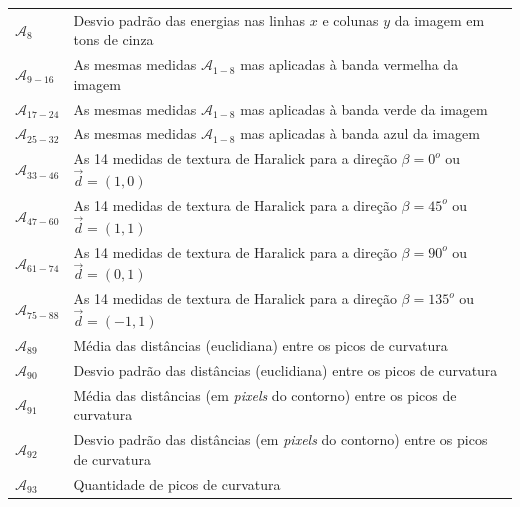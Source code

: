 \begin{table}
\begin{center}
\begin{tabular}{l|l}
    $\mathcal{A}_8$ &
    Desvio padrão das energias nas linhas $x$ e colunas $y$ da imagem em tons de
    cinza \\

    $\mathcal{A}_{9-16}$ &
    As mesmas medidas $\mathcal{A}_{1-8}$ mas aplicadas à banda vermelha da
    imagem \\

    $\mathcal{A}_{17-24}$ &
    As mesmas medidas $\mathcal{A}_{1-8}$ mas aplicadas à banda verde da
    imagem \\

    $\mathcal{A}_{25-32}$ &
    As mesmas medidas $\mathcal{A}_{1-8}$ mas aplicadas à banda azul da
    imagem \\

    $\mathcal{A}_{33-46}$ &
    As 14 medidas de textura de Haralick para a direção $\beta = 0^o$ ou $\vec{d} = (1, 0)$ \\

$\mathcal{A}_{47-60}$ &
    As 14 medidas de textura de Haralick para a direção $\beta = 45^o$ ou $\vec{d} = (1, 1)$ \\

$\mathcal{A}_{61-74}$ &
    As 14 medidas de textura de Haralick para a direção $\beta = 90^o$ ou $\vec{d} = (0, 1)$ \\

$\mathcal{A}_{75-88}$ &
    As 14 medidas de textura de Haralick para a direção $\beta = 135^o$ ou $\vec{d} = (-1, 1)$ \\

    $\mathcal{A}_{89}$ &
    Média das distâncias (euclidiana) entre os picos de curvatura \\

    $\mathcal{A}_{90}$ &
    Desvio padrão das distâncias (euclidiana) entre os picos de curvatura \\

    $\mathcal{A}_{91}$ &
    Média das distâncias (em \textit{pixels} do contorno) entre os picos de curvatura \\

    $\mathcal{A}_{92}$ &
    Desvio padrão das distâncias (em \textit{pixels} do contorno) entre os picos de
    curvatura \\

    $\mathcal{A}_{93}$ &
    Quantidade de picos de curvatura \\


\end{tabular}
\end{center}
\end{table}
